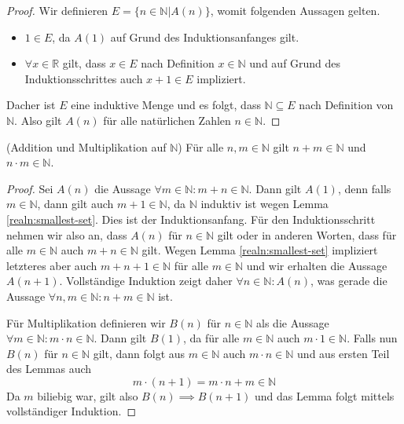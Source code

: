 \documentclass[../Analysis1_script.tex]{subfiles}
\begin{document}
\begin{proof}
	Wir definieren $E = \{n \in \mathbb{N} | A(n)\}$, womit folgenden Aussagen gelten.
	\begin{itemize}
		\item $1 \in E$, da $A(1)$ auf Grund des Induktionsanfanges gilt.
		\item $\forall x \in \mathbb{R}$ gilt, dass $x \in E$ nach Definition $x \in \mathbb{N}$ und auf Grund des Induktionsschrittes auch $x+1 \in E$ impliziert. 
	\end{itemize}
	Dacher ist $E$ eine induktive Menge und es folgt, dass $\mathbb{N} \subseteq E$ nach Definition von $\mathbb{N}$. Also gilt $A(n)$ für alle natürlichen Zahlen $n \in \mathbb{N}$.
\end{proof}

\begin{lemma}{(Addition und Multiplikation auf $\mathbb{N}$)}\label{realn:sum_and_comp_for_N}
Für alle $n, m \in \mathbb{N}$ gilt $n + m \in \mathbb{N}$ und $n \cdot m \in \mathbb{N}$. 
\end{lemma}

\begin{proof}
	Sei $A(n)$ die Aussage $\forall m \in \mathbb{N} : m + n \in \mathbb{N}$. Dann gilt $A(1)$, denn falls $m \in \mathbb{N}$, dann gilt auch $m+1 \in \mathbb{N}$, da $\mathbb{N}$ induktiv ist wegen Lemma \ref{realn:smallest-set}. Dies ist der Induktionsanfang. Für den Induktionsschritt nehmen wir also an, dass $A(n)$ für $n \in \mathbb{N}$ gilt oder in anderen Worten, dass für alle $m \in \mathbb{N}$ auch $m+n \in \mathbb{N}$ gilt. Wegen Lemma \ref{realn:smallest-set} impliziert letzteres aber auch $m + n + 1 \in \mathbb{N}$ für alle $m \in \mathbb{N}$ und wir erhalten die Aussage $A(n+1)$. Vollständige Induktion zeigt daher $\forall n \in \mathbb{N}: A(n)$, was gerade die Aussage $\forall n,m \in \mathbb{N}: n + m \in \mathbb{N}$ ist.

	Für Multiplikation definieren wir $B(n)$ für $n \in \mathbb{N}$ als die Aussage $\forall m \in \mathbb{N}: m \cdot n \in \mathbb{N}$. Dann gilt $B(1)$, da für alle $m \in \mathbb{N}$ auch $m \cdot 1 \in \mathbb{N}$. Falls nun $B(n)$ für $n \in \mathbb{N}$ gilt, dann folgt aus $m \in \mathbb{N}$ auch $m \cdot n \in \mathbb{N}$ und aus ersten Teil des Lemmas auch
	\begin{equation}
		m \cdot (n + 1) = m \cdot n + m \in \mathbb{N}
	\end{equation}
	Da $m$ biliebig war, gilt also $B(n) \implies B(n+1)$ und das Lemma folgt mittels vollständiger Induktion.
\end{proof}
\end{document}
